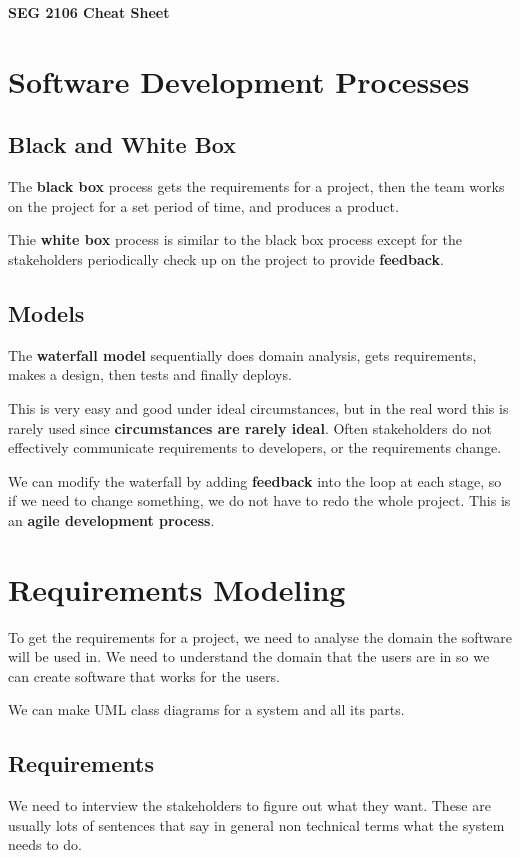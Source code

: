 \documentclass[12pt,letterpaper]{article} \usepackage{amsmath} \usepackage{graphicx} \usepackage[margin=1in]{geometry} \usepackage{longtable}  \usepackage{amssymb}
\begin{document}
	
	\begin{center}
		\Large\textbf{SEG 2106 Cheat Sheet} \\
		\vspace{0.5em}
	\end{center}
	
	\section {Software Development Processes}
	\subsection{Black and White Box}
	The \textbf{black box} process gets the requirements for a project, then the team works on the project for a set period of time, and produces a product. 
	
	Thie \textbf{white box} process is similar to the black box process except for the stakeholders periodically check up on the project to provide \textbf{feedback}. 
	
	\subsection{Models}
	The \textbf{waterfall model} sequentially does domain analysis, gets requirements, makes a design, then tests and finally deploys. 
	
	This is very easy and good under ideal circumstances, but in the real word this is rarely used since \textbf{circumstances are rarely ideal}. Often stakeholders do not effectively communicate requirements to developers, or the requirements change. 
	
	We can modify the waterfall by adding \textbf{feedback} into the loop at each stage, so if we need to change something, we do not have to redo the whole project. This is an \textbf{agile development process}. 
	
	\section{Requirements Modeling}
	To get the requirements for a project, we need to analyse the domain the software will be used in. We need to understand the domain that the users are in so we can create software that works for the users. 
	
	We can make UML class diagrams for a system and all its parts. 
	
	\subsection{Requirements}
	We need to interview the stakeholders to figure out what they want. These are usually lots of sentences that say in general non technical terms what the system needs to do. 
	
\end{document}
